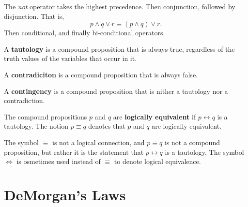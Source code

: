 The \emph{not} operator takes the highest precedence.
Then conjunction, followed by disjunction. That is,
\[ p \land q \lor r \equiv (p \land q) \lor r \text{.}\]
Then conditional, and finally bi-conditional operators.
\begin{table}[H]
  \centering
  \caption{Logical operator precedence.}
\end{table}
\begin{defn}
  A \textbf{tautology} is a compound proposition that is always true, regardless of the truth values of the variables that occur in it.
\end{defn}
\begin{defn}
  A \textbf{contradiciton} is a compound proposition that is always false.
\end{defn}
\begin{defn}
  A \textbf{contingency} is a compound proposition that is nither a tautology nor a contradiction.
\end{defn}
\begin{defn}
  The compound propositions \(p\) and \(q\) are \textbf{logically equivalent} if \(p \leftrightarrow q\) is a tautology.
  The notion \(p \equiv q\) denotes that \(p\) and \(q\) are logically equivalent.
  \begin{remark}
    The symbol \(\equiv\) is not a logical connection, and \(p\equiv q\) is not a compound proposition,
    but rather it is the statement that \(p \leftrightarrow q\) is a tautology.
    The symbol \(\iff\) is osmetimes used instead of \(\equiv\) to denote logical equivalence.
  \end{remark}
\end{defn}

\section{DeMorgan's Laws}

